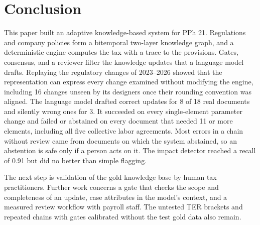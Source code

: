 \section{Conclusion}
\label{sec:conclusion}
This paper built an adaptive knowledge-based system for PPh 21. Regulations and company policies form a bitemporal two-layer knowledge graph, and a deterministic engine computes the tax with a trace to the provisions. Gates, consensus, and a reviewer filter the knowledge updates that a language model drafts. Replaying the regulatory changes of 2023--2026 showed that the representation can express every change examined without modifying the engine, including 16 changes unseen by its designers once their rounding convention was aligned. The language model drafted correct updates for 8 of 18 real documents and silently wrong ones for 3. It succeeded on every single-element parameter change and failed or abstained on every document that needed 11 or more elements, including all five collective labor agreements. Most errors in a chain without review came from documents on which the system abstained, so an abstention is safe only if a person acts on it. The impact detector reached a recall of 0.91 but did no better than simple flagging.

The next step is validation of the gold knowledge base by human tax practitioners. Further work concerns a gate that checks the scope and completeness of an update, case attributes in the model's context, and a measured review workflow with payroll staff. The untested TER brackets and repeated chains with gates calibrated without the test gold data also remain.
